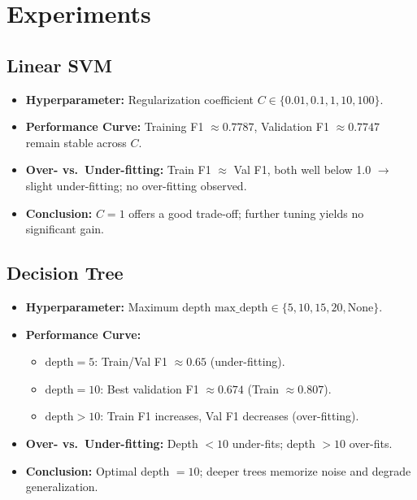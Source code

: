 \documentclass{article}
\begin{document}
\maketitle

\section{Experiments}

\subsection{Linear SVM}
\begin{itemize}
  \item \textbf{Hyperparameter:} Regularization coefficient $C \in \{0.01, 0.1, 1, 10, 100\}$.
  \item \textbf{Performance Curve:} Training F1 $\approx0.7787$, Validation F1 $\approx0.7747$ remain stable across $C$.
  \item \textbf{Over- vs.\ Under-fitting:} Train F1 $\approx$ Val F1, both well below 1.0 $\rightarrow$ slight under-fitting; no over-fitting observed.
  \item \textbf{Conclusion:} $C=1$ offers a good trade-off; further tuning yields no significant gain.
\end{itemize}

\subsection{Decision Tree}
\begin{itemize}
  \item \textbf{Hyperparameter:} Maximum depth $\text{max\_depth} \in \{5, 10, 15, 20, \text{None}\}$.
  \item \textbf{Performance Curve:}
    \begin{itemize}
      \item $\text{depth}=5$: Train/Val F1 $\approx0.65$ (under-fitting).
      \item $\text{depth}=10$: Best validation F1 $\approx0.674$ (Train $\approx0.807$).
      \item $\text{depth}>10$: Train F1 increases, Val F1 decreases (over-fitting).
    \end{itemize}
  \item \textbf{Over- vs.\ Under-fitting:} Depth $<10$ under-fits; depth $>10$ over-fits.
  \item \textbf{Conclusion:} Optimal depth $=10$; deeper trees memorize noise and degrade generalization.
\end{itemize}
\end{document}
